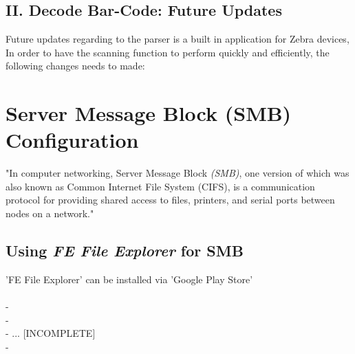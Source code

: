 \documentclass[a4paper]{article}
\begin{document}
\subsection*{II. Decode Bar-Code: Future Updates}
\begin{scriptsize}
	Future updates regarding to the parser is a built in application for Zebra devices, In order to have the scanning function to perform quickly and efficiently, the following changes needs to made:
 	
\end{scriptsize}

\section{Server Message Block (SMB) Configuration}
\begin{scriptsize}
	"In computer networking, Server Message Block \emph{(SMB)}, one version of which was also known as Common Internet File System (CIFS), is a communication protocol for providing shared access to files, printers, and serial ports between nodes on a network."
	

	\subsection*{Using \emph{FE File Explorer} for SMB}
	'FE File Explorer' can be installed via 'Google Play Store'
	\\  
	\\- 
	\\- 
	\\- ... [INCOMPLETE]
	\\- 
	
\end{scriptsize}
\end{document}
